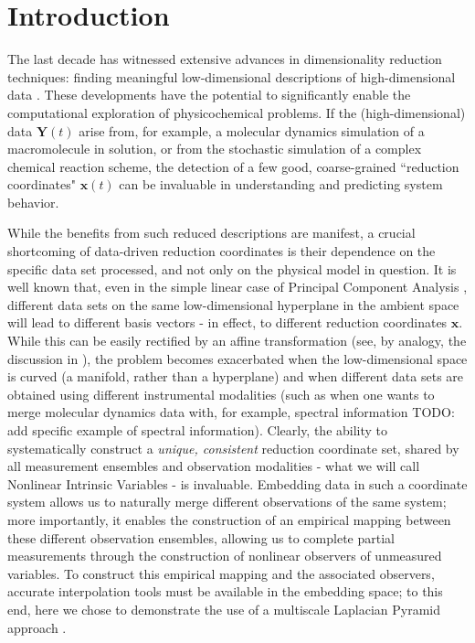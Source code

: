 \documentclass[aip,jcp,preprint]{revtex4-1}
\begin{document}

\maketitle

\section{Introduction}
The last decade has witnessed extensive advances in dimensionality reduction techniques:
finding meaningful low-dimensional descriptions of high-dimensional data \cite{Tenenbaum2000,Roweis2000,Donoho2003,Belkin2003,Coifman2006}.
%
These developments have the potential to significantly enable the computational exploration
of physicochemical problems.
%
If the (high-dimensional) data $\mathbf{Y}(t)$ arise from, for example, a
molecular dynamics simulation of a macromolecule in solution, or from the stochastic
simulation of a complex chemical reaction scheme, the detection of a few good, coarse-grained
``reduction coordinates" $\mathbf{x}(t)$ can be invaluable in understanding and predicting system behavior.

While the benefits from such reduced descriptions are manifest, a crucial shortcoming of
 data-driven reduction coordinates is their dependence on the specific data set processed,
and not only on the physical model in question.
%
It is well known that, even in the simple linear case of Principal Component Analysis \cite{jolliffe2005principal},
different data sets on the same low-dimensional hyperplane in the ambient space
will lead to different basis vectors - in effect, to different reduction coordinates $\mathbf{x}$.
%
While this can be easily rectified by an affine transformation
(see, by analogy, the discussion in \cite{lafon2006data}),
the problem becomes
exacerbated when the low-dimensional space is curved (a manifold, rather than a hyperplane)
and when different data sets are obtained using different instrumental modalities
(such as when one wants to merge molecular dynamics data with, for example, spectral information {\color{red} TODO: add specific example of spectral information}).
%
Clearly, the ability to systematically construct a {\em unique, consistent} reduction
coordinate set, shared by all measurement ensembles and observation modalities -
what we will call Nonlinear Intrinsic Variables - is invaluable.
%
Embedding data in such a coordinate system allows us to naturally merge different observations of the same system;
more importantly, it enables the construction of an empirical mapping between these different
observation ensembles, allowing us to complete partial measurements through the construction
of nonlinear observers of unmeasured variables.
%
%
To construct this empirical mapping and the associated observers,
accurate interpolation tools must be available in the embedding space; to this
end, here we chose to demonstrate the use of a multiscale Laplacian Pyramid approach \cite{rabin2012heterogeneous}.
\end{document}
